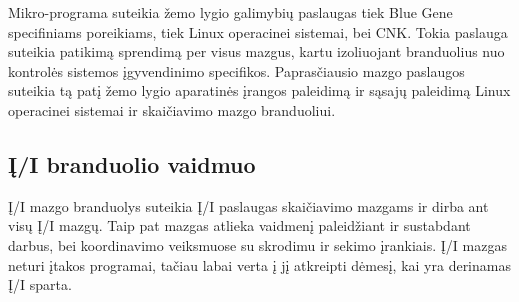 Mikro-programa suteikia žemo lygio galimybių paslaugas tiek Blue Gene specifiniams poreikiams, tiek Linux operacinei sistemai, bei CNK.
Tokia paslauga suteikia patikimą sprendimą per visus mazgus, kartu izoliuojant branduolius nuo kontrolės sistemos įgyvendinimo specifikos.
Paprasčiausio mazgo paslaugos suteikia tą patį žemo lygio aparatinės įrangos paleidimą ir sąsajų paleidimą Linux operacinei sistemai ir skaičiavimo mazgo branduoliui.

\subsection{Į/I branduolio vaidmuo}

Į/I mazgo branduolys suteikia Į/I paslaugas skaičiavimo mazgams ir dirba ant visų Į/I mazgų.
Taip pat mazgas atlieka vaidmenį paleidžiant ir sustabdant darbus, bei koordinavimo veiksmuose su skrodimu ir sekimo įrankiais. Į/I mazgas neturi įtakos programai, tačiau labai verta į jį atkreipti dėmesį, kai yra derinamas Į/I sparta.